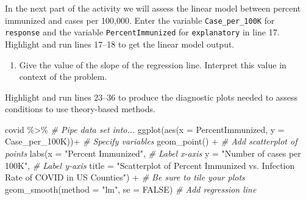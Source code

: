 \documentclass[
]{report}
\newenvironment{Shaded}{\begin{snugshade}}{\end{snugshade}}
\newcommand{\AttributeTok}[1]{\textcolor[rgb]{0.77,0.63,0.00}{#1}}
\newcommand{\CommentTok}[1]{\textcolor[rgb]{0.56,0.35,0.01}{\textit{#1}}}
\newcommand{\ConstantTok}[1]{\textcolor[rgb]{0.00,0.00,0.00}{#1}}
\newcommand{\FunctionTok}[1]{\textcolor[rgb]{0.00,0.00,0.00}{#1}}
\newcommand{\NormalTok}[1]{#1}
\newcommand{\OtherTok}[1]{\textcolor[rgb]{0.56,0.35,0.01}{#1}}
\newcommand{\SpecialCharTok}[1]{\textcolor[rgb]{0.00,0.00,0.00}{#1}}
\newcommand{\StringTok}[1]{\textcolor[rgb]{0.31,0.60,0.02}{#1}}
\providecommand{\tightlist}{%
  \setlength{\itemsep}{0pt}\setlength{\parskip}{0pt}}
\begin{document}
In the next part of the activity we will assess the linear model between percent immunized and cases per 100,000. Enter the variable \texttt{Case\_per\_100K} for \texttt{response} and the variable \texttt{PercentImmunized} for \texttt{explanatory} in line 17. Highlight and run lines 17--18 to get the linear model output.

\begin{Shaded}
\end{Shaded}

\begin{enumerate}
\def\labelenumi{\arabic{enumi}.}
\setcounter{enumi}{4}
\tightlist
\item
  Give the value of the slope of the regression line. Interpret this value in context of the problem.
  \vspace{0.6in}
\end{enumerate}

Highlight and run lines 23--36 to produce the diagnostic plots needed to assess conditions to use theory-based methods.

\begin{Shaded}
\begin{Highlighting}[]
\NormalTok{covid }\SpecialCharTok{\%\textgreater{}\%} \CommentTok{\# Pipe data set into...}
  \FunctionTok{ggplot}\NormalTok{(}\FunctionTok{aes}\NormalTok{(}\AttributeTok{x =}\NormalTok{ PercentImmunized, }\AttributeTok{y =}\NormalTok{ Case\_per\_100K))}\SpecialCharTok{+}  \CommentTok{\# Specify variables}
  \FunctionTok{geom\_point}\NormalTok{() }\SpecialCharTok{+}  \CommentTok{\# Add scatterplot of points}
  \FunctionTok{labs}\NormalTok{(}\AttributeTok{x =} \StringTok{"Percent Immunized"}\NormalTok{,  }\CommentTok{\# Label x{-}axis}
       \AttributeTok{y =} \StringTok{"Number of cases per 100K"}\NormalTok{,  }\CommentTok{\# Label y{-}axis}
       \AttributeTok{title =} \StringTok{"Scatterplot of Percent Immunized vs. Infection Rate of COVID in US Counties"}\NormalTok{) }\SpecialCharTok{+} 
               \CommentTok{\# Be sure to tile your plots}
  \FunctionTok{geom\_smooth}\NormalTok{(}\AttributeTok{method =} \StringTok{"lm"}\NormalTok{, }\AttributeTok{se =} \ConstantTok{FALSE}\NormalTok{)  }\CommentTok{\# Add regression line}
\end{Highlighting}
\end{Shaded}
\end{document}
